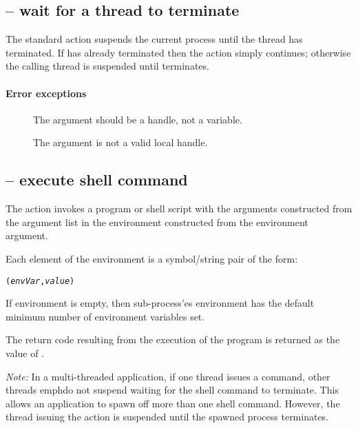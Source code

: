 \subsection{ -- wait for a thread to terminate}
\label{misc:waitfor}


The  standard action suspends the current process until the  thread has terminated. If  has already terminated then the  action simply continues; otherwise the calling thread is suspended until  terminates.

\paragraph{Error exceptions}
\begin{description}
\item[]
The  argument should be a handle, not a variable.
\item[]
The  argument is not a valid local handle.
\end{description}

\subsection{ -- execute shell command}
\label{misc:shell}


The  action invokes a  program or shell script with the arguments constructed from the argument list in the environment constructed from the environment argument.

Each element of the environment is a symbol/string pair of the form:
\begin{alltt}
(\emph{envVar},\emph{value})
\end{alltt}
If environment is empty, then sub-process'es environment has the default minimum number of environment variables set.

The return code resulting from the execution of the program is returned as the value of .

\emph{Note:}
In a multi-threaded \go application, if one thread issues a  command, other threads emph{do not} suspend waiting for the shell command to terminate. This allows an application to spawn off more than one shell command. However, the thread issuing the  action is suspended until the spawned process terminates.



